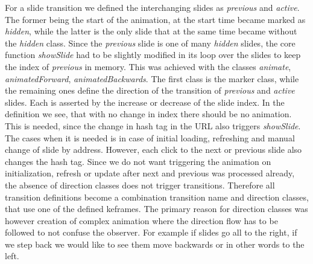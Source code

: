 For a slide transition we defined the interchanging slides as \textit{previous} 
and \textit{active}. The former being the start of the animation, at the start 
time became marked as \textit{hidden}, while the latter is the only slide that 
at the same time became without the \textit{hidden} class. Since the 
\textit{previous} slide is one of many \textit{hidden} slides, the core 
function \textit{showSlide} had to be slightly modified in its loop over the 
slides to keep the index of \textit{previous} in memory. This was achieved with 
the classes \textit{animate}, \textit{animatedForward}, 
\textit{animatedBackwards}. The first class is the marker class, while the 
remaining ones define the direction of the transition of \textit{previous} and 
\textit{active} slides. Each is asserted by the increase or decrease of the 
slide index. In the definition we see, that with no change in index there 
should be no animation. This is needed, since the change in hash tag in the URL 
also triggers \textit{showSlide}. The cases when it is needed is in case of 
initial loading, refreshing and manual change of slide by address. However, 
each click to the next or previous slide also changes the hash tag. Since we do 
not want triggering the animation on initialization, refresh or update after 
next and previous was processed already, the absence of direction classes does 
not trigger transitions. Therefore all transition definitions become a 
combination transition name and direction classes, that use one of the defined 
keframes. The primary reason for direction classes was however creation of 
complex animation where the direction flow has to be followed to not confuse 
the observer. For example if slides go all to the right, if we step back we 
would like to see them move backwards or in other words to the left.


